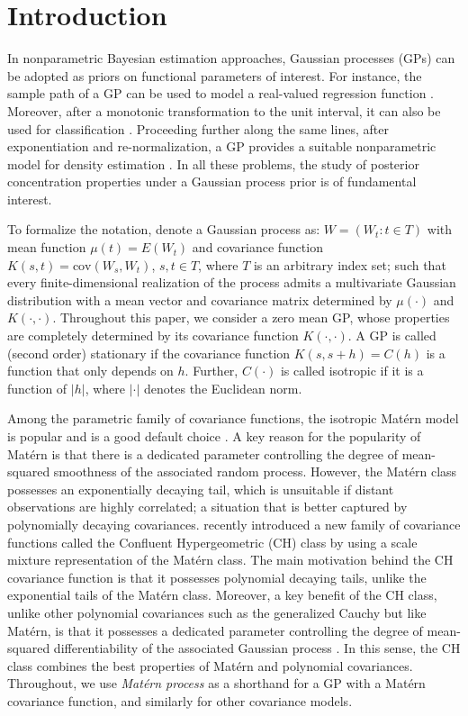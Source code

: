 \documentclass[ejs,noshowframe]{imsart}
\theoremstyle{plain}
\theoremstyle{definition}
\theoremstyle{remark}
\begin{document}
\section{Introduction}
In nonparametric Bayesian estimation approaches, Gaussian processes (GPs) can be adopted as  priors on functional parameters of interest. For
instance, the sample path of a GP can be used to model a real-valued regression function   \citep{kimeldorf1970correspondence,williams2006gaussian}. Moreover, after a monotonic transformation to the unit interval, it can also be used for classification \citep{williams2006gaussian,ghosal2006posterior}. Proceeding further along the same lines, after exponentiation and re-normalization, a GP provides a suitable nonparametric model for density estimation \citep{leonard1978density,tokdar2007posterior}. In all these problems, the study of posterior concentration properties under a Gaussian process prior is of fundamental interest.

To formalize the notation, denote a Gaussian process as: $W=(W_t: t\in T)$ with mean function $\mu(t) = E(W_t)$ and covariance function $K(s,t) = \mathrm{cov}(W_s,W_t )$, $s,t \in T$, where $T$ is an arbitrary index set; such that every finite-dimensional realization of the process admits a multivariate Gaussian distribution with a mean vector and covariance matrix determined by $\mu(\cdot)$ and $K(\cdot, \cdot)$.  Throughout this paper, we consider a zero mean GP, whose properties are completely determined by its covariance function $K(\cdot,\cdot)$. A GP is called (second order) stationary if  the covariance function $K(s,s+h)=C(h)$ is  a function that  only depends on $h$. Further, $C(\cdot)$ is called isotropic if it is a function of $|h|$, where $|\cdot|$ denotes the Euclidean norm.

Among the parametric family of covariance functions, the isotropic Mat\'ern model is popular and is a good default choice \citep{stein1999interpolation,porcu2023mat}. A key reason for the popularity of Mat\'ern is that there is a dedicated parameter controlling the degree of mean-squared smoothness of the associated random process. However, the Mat\'ern class possesses an exponentially decaying tail, which is unsuitable if distant observations are highly correlated; a situation that is better captured by polynomially decaying covariances.  \citet{ma2022beyond} recently introduced a new family of covariance functions called the Confluent Hypergeometric (CH) class by using a scale mixture representation of the Mat\'ern class. The main motivation behind the CH covariance function is that it possesses polynomial decaying tails, unlike the exponential tails of the Mat\'ern class. Moreover, a key benefit of the CH class, unlike other polynomial covariances such as the generalized Cauchy but like Mat\'ern, is that it possesses a dedicated parameter controlling the degree of mean-squared differentiability of the associated Gaussian process \citep{stein1999interpolation}. In this sense, the CH class combines the best properties of Mat\'ern and polynomial covariances.  Throughout, we use \emph{Mat\'ern process} as a shorthand for a GP with a Mat\'ern covariance function, and similarly for other covariance models.
\end{document}
